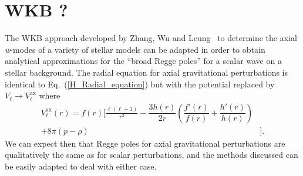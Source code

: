 \documentclass[aps,prd,longbibliography,reprint,twocolumn,amsmath,amssymb,amsfonts,showpacs,superscriptaddress]{revtex4-1}%
\begin{document}
\section{WKB ?}
\label{SecIII}

The WKB approach developed by Zhang, Wu and Leung~\cite{Zhang:2011pq} to determine the axial \textit{w}-modes of a variety of stellar models can be adapted in order to obtain analytical approximations for the ``broad Regge poles'' for a scalar wave on a stellar background. The radial equation for axial gravitational perturbations is identical to Eq.~(\ref{H_Radial_equation}) but with the potential replaced by $V_{\ell} \rightarrow V_{\ell}^{\text{ax}}$ where \cite{Cardoso:2014sna}
\begin{eqnarray}\label{RW_Potentiel_axialGW}
V_{\ell}^{\text{ax}}(r) = f(r)\bigg[\frac{\ell(\ell+1)}{r^2}  - \dfrac{3 h(r)}{2r}\left(\dfrac{f'(r)}{f(r)}+\dfrac{h'(r)}{h(r)}\right) & \nonumber \\
	 + 8 \pi (p - \rho) & \bigg] .
\end{eqnarray}
%
We can expect then that Regge poles for axial gravitational perturbations are qualitatively the same as for scalar perturbations, and the methods discussed can be easily adapted to deal with either case.

\newcommand{\phiout}{\phi^{\text{out}}_{\omega, \lambda-1/2}}
\newcommand{\phireg}{\phi^{}_{\omega, \lambda-1/2}}
\end{document}
